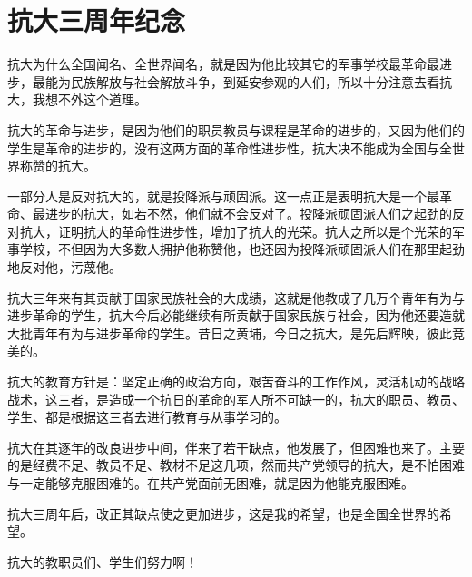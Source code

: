 \section[抗大三周年纪念（一九三九年五月二十六日）]{抗大三周年纪念}


抗大为什么全国闻名、全世界闻名，就是因为他比较其它的军事学校最革命最进步，最能为民族解放与社会解放斗争，到延安参观的人们，所以十分注意去看抗大，我想不外这个道理。

抗大的革命与进步，是因为他们的职员教员与课程是革命的进步的，又因为他们的学生是革命的进步的，没有这两方面的革命性进步性，抗大决不能成为全国与全世界称赞的抗大。

一部分人是反对抗大的，就是投降派与顽固派。这一点正是表明抗大是一个最革命、最进步的抗大，如若不然，他们就不会反对了。投降派顽固派人们之起劲的反对抗大，证明抗大的革命性进步性，增加了抗大的光荣。抗大之所以是个光荣的军事学校，不但因为大多数人拥护他称赞他，也还因为投降派顽固派人们在那里起劲地反对他，污蔑他。

抗大三年来有其贡献于国家民族社会的大成绩，这就是他教成了几万个青年有为与进步革命的学生，抗大今后必能继续有所贡献于国家民族与社会，因为他还要造就大批青年有为与进步革命的学生。昔日之黄埔，今日之抗大，是先后辉映，彼此竞美的。

抗大的教育方针是：坚定正确的政治方向，艰苦奋斗的工作作风，灵活机动的战略战术，这三者，是造成一个抗日的革命的军人所不可缺一的，抗大的职员、教员、学生、都是根据这三者去进行教育与从事学习的。

抗大在其逐年的改良进步中间，伴来了若干缺点，他发展了，但困难也来了。主要的是经费不足、教员不足、教材不足这几项，然而共产党领导的抗大，是不怕困难与一定能够克服困难的。在共产党面前无困难，就是因为他能克服困难。

抗大三周年后，改正其缺点使之更加进步，这是我的希望，也是全国全世界的希望。

抗大的教职员们、学生们努力啊！


